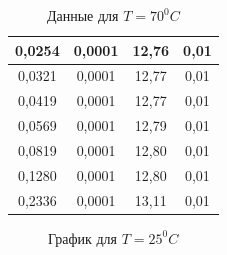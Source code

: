 \documentclass[a4paper, 12pt]{article}%
\begin{document}
\begin{enumerate}
\begin{table}[h]
\begin{center}
\begin{tabular}{|c|c|c|c|}
0,0254 & 0,0001 & 12,76 & 0,01 \\ \hline
0,0321 & 0,0001 & 12,77 & 0,01 \\ \hline
0,0419 & 0,0001 & 12,77 & 0,01 \\ \hline
0,0569 & 0,0001 & 12,79 & 0,01 \\ \hline
0,0819 & 0,0001 & 12,80 & 0,01 \\ \hline
0,1280 & 0,0001 & 12,80 & 0,01 \\ \hline
0,2336 & 0,0001 & 13,11 & 0,01 \\ \hline
\end{tabular}
\end{center}
\caption{Данные для $T = 70 ^0 C$}
\end{table}
\FloatBarrier
\FloatBarrier
\begin{figure}[h]
\caption{График для $T = 25 ^0 C$}
\end{figure}
\FloatBarrier
\FloatBarrier
\begin{figure}[h]

\end{figure}
\end{enumerate}
\end{document}
